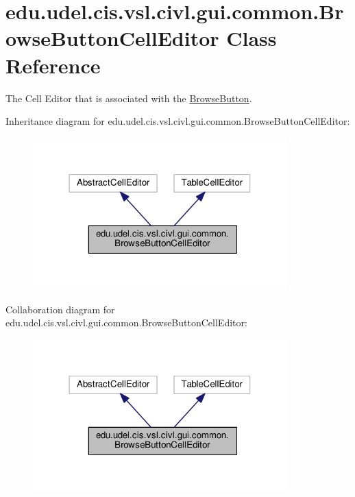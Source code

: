 \hypertarget{classedu_1_1udel_1_1cis_1_1vsl_1_1civl_1_1gui_1_1common_1_1BrowseButtonCellEditor}{}\section{edu.\+udel.\+cis.\+vsl.\+civl.\+gui.\+common.\+Browse\+Button\+Cell\+Editor Class Reference}
\label{classedu_1_1udel_1_1cis_1_1vsl_1_1civl_1_1gui_1_1common_1_1BrowseButtonCellEditor}


The Cell Editor that is associated with the \hyperlink{classedu_1_1udel_1_1cis_1_1vsl_1_1civl_1_1gui_1_1common_1_1BrowseButton}{Browse\+Button}.  




Inheritance diagram for edu.\+udel.\+cis.\+vsl.\+civl.\+gui.\+common.\+Browse\+Button\+Cell\+Editor\+:
\nopagebreak
\begin{figure}[H]
\begin{center}
\leavevmode
\includegraphics[width=278pt]{classedu_1_1udel_1_1cis_1_1vsl_1_1civl_1_1gui_1_1common_1_1BrowseButtonCellEditor__inherit__graph}
\end{center}
\end{figure}


Collaboration diagram for edu.\+udel.\+cis.\+vsl.\+civl.\+gui.\+common.\+Browse\+Button\+Cell\+Editor\+:
\nopagebreak
\begin{figure}[H]
\begin{center}
\leavevmode
\includegraphics[width=278pt]{classedu_1_1udel_1_1cis_1_1vsl_1_1civl_1_1gui_1_1common_1_1BrowseButtonCellEditor__coll__graph}
\end{center}
\end{figure}
